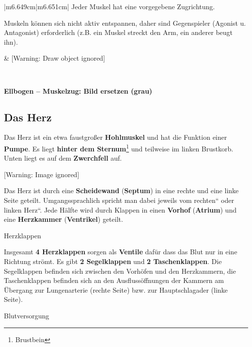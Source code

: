 \documentclass{article}
\newcommand\gEs[1]{\textbf{\textcolor[rgb]{0.0,0.0,0.5019608}{#1}}}
\newcommand\gEs[1]{\textbf{\textcolor[rgb]{0.0,0.0,0.5019608}{#1}}}
\newcommand\gT[1]{\textbf{\textup{\textcolor[rgb]{0.0,0.5019608,0.0}{#1}}}}
\begin{document}
\begin{center}
\tablehead{}\begin{supertabular}{|m{6.649cm}|m{6.651cm}|}
\hline
{\mdseries Jeder Muskel hat eine vorgegebene  Zugrichtung. }

{\mdseries Muskeln k\"onnen sich nicht aktiv  entspannen, daher sind
Gegenspieler  (Agonist u. Antagonist) erforderlich (z.B. ein Muskel
streckt den Arm, ein anderer beugt ihn).}

 &
%
%
[Warning: Draw object ignored]

\\\hline
\end{supertabular}
\end{center}
{\bfseries\color[rgb]{0.5019608,0.0,0.0}
Ellbogen -- Muskelzug: Bild ersetzen (grau)}

\subsection{Das Herz}
{\mdseries
Das Herz ist ein etwa faustgro{\ss}er
\gEs{Hohlmuskel} und hat die Funktion einer
\gEs{Pumpe}. Es liegt \gEs{hinter
dem Sternum}\footnote{Brustbein} und teilweise im linken Brustkorb.
Unten liegt es auf dem \gEs{Zwerchfell} auf. }

\begin{center}
 [Warning: Image ignored] %

\end{center}
{\mdseries
Das Herz ist durch eine \gEs{Scheidewand}
(\gT{Septum}) in eine rechte und eine linke Seite
geteilt. Umgangssprachlich spricht man dabei jeweils vom
{\quotedblbase}rechten{\textquotedblleft} oder {\quotedblbase}linken
Herz{\textquotedblleft}. Jede H\"alfte wird durch Klappen in einen
\gEs{Vorhof} (\gT{Atrium}) und eine
\gEs{Herzkammer} (\gT{Ventrikel})
geteilt. }

{\mdseries\color{black}
Herzklappen}

{\mdseries
Insgesamt \gEs{4 Herzklappen} sorgen als
\gEs{Ventile} daf\"ur dass das Blut nur in eine
Richtung str\"omt. Es gibt \gEs{2 Segelklappen} und
\gEs{2 Taschenklappen}. Die Segelklappen befinden
sich zwischen den Vorh\"ofen und den Herzkammern, die Taschenklappen
befinden sich an den Ausfluss\"offnungen der Kammern am \"Ubergang zur
Lungenarterie (rechte Seite) bzw. zur Hauptschlagader (linke Seite). }

{\mdseries\color{black}
Blutversorgung}
\end{document}

